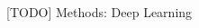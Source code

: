 \documentclass[final,hyperref={pdfpagelabels=false}]{beamer}
\begin{document}
\begin{frame}[t]
\begin{columns}[t]
\begin{column}{.465\textwidth}
\begin{block}{[TODO] Methods: Deep Learning}
\end{block}






     



\end{column}
\end{columns}
\end{frame}
\end{document}
